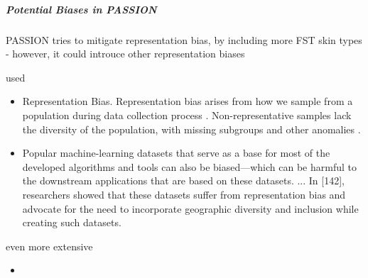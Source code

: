 \documentclass[12pt, a4paper, oneside]{book}   	%
\newif\ifrawcitationactive
\newcommand{\rawcitationstart}{\color{purple}\rawcitationactivetrue}
\newcommand{\rawcitationusedstart}{\color{violet}}
\newcommand{\rawcitationusedend}{%
	\ifrawcitationactive
	\color{purple}  %
	\else
	\color{black}  %
	\fi
}
\begin{document}
				
				\subparagraph{Potential Biases in PASSION}
				PASSION tries to mitigate representation bias, by including more FST skin types - however, it could introuce other representation biases
				
				
				\rawcitationstart
				used
				\begin{itemize}		
					\rawcitationusedstart
					\item Representation Bias. Representation bias arises from how we sample from a population during data collection process \autocite{M144_Suresh_2021}. Non-representative samples lack the diversity of the population, with missing subgroups and other anomalies \autocite{Mehrabi_2021}.
					\item Popular machine-learning datasets that serve as a base for most of the developed algorithms and tools can also be biased—which can be harmful to the downstream applications that are based on these datasets. ... In [142], researchers showed that these datasets suffer from representation bias and advocate for the need to incorporate geographic diversity and inclusion while creating such datasets. \autocite{Mehrabi_2021}
					\rawcitationusedend
				\end{itemize}
				
				even more extensive
				\begin{itemize}
					\item 
				\end{itemize}
								
\end{document}
